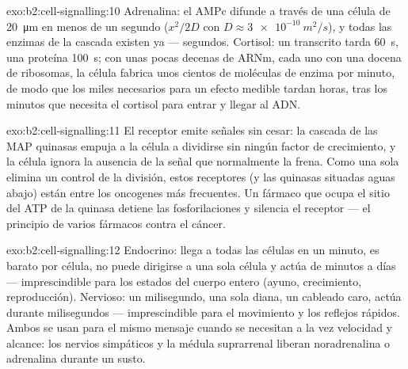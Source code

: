 \begin{solution}{exo:b2:cell-signalling:10}
Adrenalina: el AMPc difunde a través de una célula de \qty{20}{\micro m}
en menos de un segundo ($x^{2}/2D$ con $D \approx \qty{3e-10}{m^2/s}$), y
todas las enzimas de la cascada existen ya --- segundos. Cortisol: un
transcrito tarda \qty{60}{s}, una proteína \qty{100}{s}; con unas pocas
decenas de ARNm, cada uno con una docena de ribosomas, la célula fabrica
unos cientos de moléculas de enzima por minuto, de modo que los miles
necesarios para un efecto medible tardan horas, tras los minutos que
necesita el cortisol para entrar y llegar al ADN.
\end{solution}

\begin{solution}{exo:b2:cell-signalling:11}
El receptor emite señales sin cesar: la cascada de las MAP quinasas empuja
a la célula a dividirse sin ningún factor de crecimiento, y la célula
ignora la ausencia de la señal que normalmente la frena. Como una sola
 elimina un control de la división, estos receptores (y las
quinasas situadas aguas abajo) están entre los oncogenes más frecuentes.
Un fármaco que ocupa el sitio del ATP de la quinasa detiene las
fosforilaciones y silencia el receptor --- el principio de varios
fármacos contra el cáncer.
\end{solution}

\begin{solution}{exo:b2:cell-signalling:12}
Endocrino: llega a todas las células en un minuto, es barato por célula,
no puede dirigirse a una sola célula y actúa de minutos a días ---
imprescindible para los estados del cuerpo entero (ayuno, crecimiento,
reproducción). Nervioso: un milisegundo, una sola diana, un cableado caro,
actúa durante milisegundos --- imprescindible para el movimiento y los
reflejos rápidos. Ambos se usan para el mismo mensaje cuando se necesitan
a la vez velocidad y alcance: los nervios simpáticos y la médula
suprarrenal liberan noradrenalina o adrenalina durante un susto.
\end{solution}

